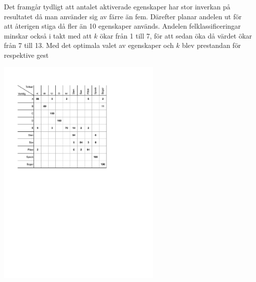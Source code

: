 \documentclass[../rapport_MVEX01-11-05]{subfiles}
\begin{document}
Det framgår tydligt att antalet aktiverade egenskaper har stor
inverkan på resultatet då man använder sig av färre än
fem. Därefter planar andelen ut för att återigen stiga då
fler än 10 egenskaper används. Andelen felklassificeringar
minskar också i takt med att $k$ ökar från 1 till 7, för att sedan
öka då värdet ökar från 7 till 13. Med det optimala
valet av egenskaper och $k$ blev prestandan för respektive gest



\begin{table}[tbp]
	  \centering
		\label{tab:tolkningsmatris}
		\caption{SKRIV MIG!}
    \includegraphics[trim=2cm 15cm 6cm 2.5cm,clip=true,width=8cm]{bilder/tolkningsmatris.pdf}
\end{table}

\end{document}
